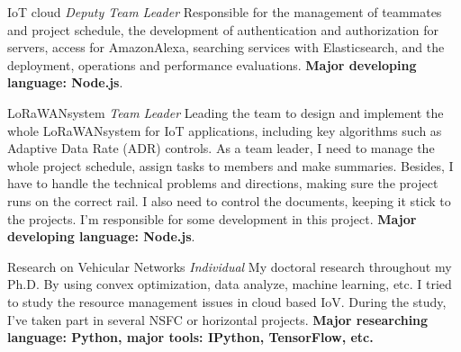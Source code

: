 \documentclass[10pt]{article} %
\begin{document}
\begin{paracol}{2}
{} %
{IoT cloud} %
{\textit{Deputy Team Leader}} %
{Responsible for the management of teammates and project schedule, the development of authentication and authorization for servers, access for Amazon\faAmazon Alexa, searching services with Elasticsearch, and the deployment, operations and performance evaluations. \textbf{Major developing language: Node.js}.}  %


{} %
{LoRaWAN\texttrademark system} %
{\textit{Team Leader}} %
{Leading the team to design and implement the whole LoRaWAN\texttrademark system for IoT applications, including key algorithms such as Adaptive Data Rate (ADR) controls. As a team leader, I need to manage the whole project schedule, assign tasks to members and make summaries. Besides, I have to handle the technical problems and directions, making sure the project runs on the correct rail. I also need to control the documents, keeping it stick to the projects. I'm responsible for some development in this project. \textbf{Major developing language: Node.js}.} %


{} %
{Research on Vehicular Networks} %
{\textit{Individual}} %
{My doctoral research throughout my Ph.D. By using convex optimization, data analyze, machine learning, etc. I tried to study the resource management issues in cloud based IoV. During the study, I've taken part in several NSFC or horizontal projects. \textbf{Major researching language: Python, major tools: IPython, TensorFlow, etc.}} %

\vspace{-\baselineskip}\medskip %






\end{paracol}
\end{document}
